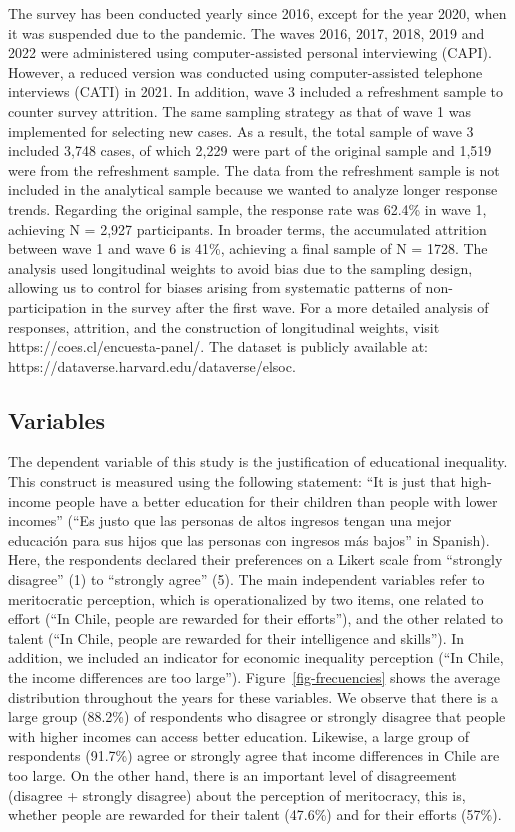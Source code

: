 \documentclass[
]{article}
\begin{document}
The survey has been conducted yearly since 2016, except for the year
2020, when it was suspended due to the pandemic. The waves 2016, 2017,
2018, 2019 and 2022 were administered using computer-assisted personal
interviewing (CAPI). However, a reduced version was conducted using
computer-assisted telephone interviews (CATI) in 2021. In addition, wave
3 included a refreshment sample to counter survey attrition. The same
sampling strategy as that of wave 1 was implemented for selecting new
cases. As a result, the total sample of wave 3 included 3,748 cases, of
which 2,229 were part of the original sample and 1,519 were from the
refreshment sample. The data from the refreshment sample is not included
in the analytical sample because we wanted to analyze longer response
trends. Regarding the original sample, the response rate was 62.4\% in
wave 1, achieving N = 2,927 participants. In broader terms, the
accumulated attrition between wave 1 and wave 6 is 41\%, achieving a
final sample of N = 1728. The analysis used longitudinal weights to
avoid bias due to the sampling design, allowing us to control for biases
arising from systematic patterns of non-participation in the survey
after the first wave. For a more detailed analysis of responses,
attrition, and the construction of longitudinal weights, visit
https://coes.cl/encuesta-panel/. The dataset is publicly available at:
https://dataverse.harvard.edu/dataverse/elsoc.

\subsection{Variables}\label{variables}

The dependent variable of this study is the justification of educational
inequality. This construct is measured using the following statement:
``It is just that high-income people have a better education for their
children than people with lower incomes'' (``Es justo que las personas
de altos ingresos tengan una mejor educación para sus hijos que las
personas con ingresos más bajos'' in Spanish). Here, the respondents
declared their preferences on a Likert scale from ``strongly disagree''
(1) to ``strongly agree'' (5). The main independent variables refer to
meritocratic perception, which is operationalized by two items, one
related to effort (``In Chile, people are rewarded for their efforts''),
and the other related to talent (``In Chile, people are rewarded for
their intelligence and skills''). In addition, we included an indicator
for economic inequality perception (``In Chile, the income differences
are too large''). Figure~\ref{fig-frecuencies} shows the average
distribution throughout the years for these variables. We observe that
there is a large group (88.2\%) of respondents who disagree or strongly
disagree that people with higher incomes can access better education.
Likewise, a large group of respondents (91.7\%) agree or strongly agree
that income differences in Chile are too large. On the other hand, there
is an important level of disagreement (disagree + strongly disagree)
about the perception of meritocracy, this is, whether people are
rewarded for their talent (47.6\%) and for their efforts (57\%).
\end{document}
